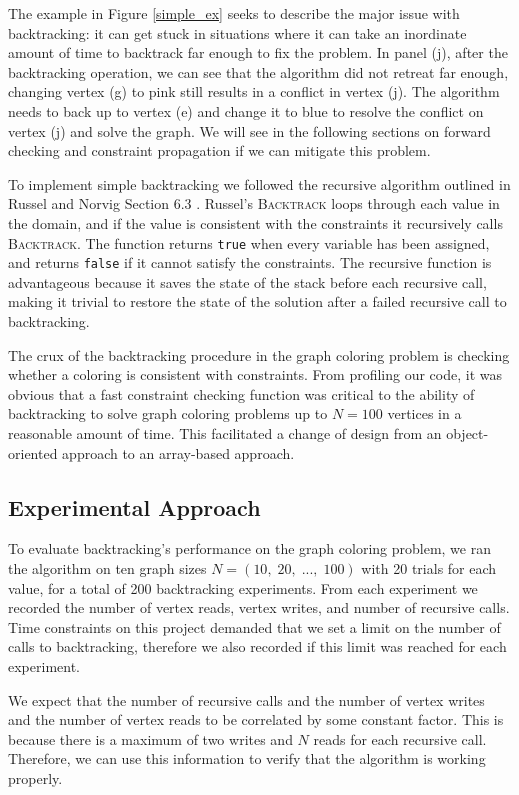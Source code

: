 \documentclass{article}
\begin{document}
		The example in Figure \ref{simple_ex} seeks to describe the major issue with backtracking: it can get stuck in situations where it can take an inordinate amount of time to backtrack far enough to fix the problem. In panel (j), after the backtracking operation, we can see that the algorithm did not retreat far enough, changing vertex (g) to pink still results in a conflict in vertex (j). The algorithm needs to back up to vertex (e) and change it to blue to resolve the conflict on vertex (j) and solve the graph. We will see in the following sections on forward checking and constraint propagation if we can mitigate this problem.

		
		To implement simple backtracking we followed the recursive algorithm outlined in Russel and Norvig Section 6.3 \cite{ai}. Russel's \textsc{Backtrack} loops through each value in the domain, and if the value is consistent with the constraints it recursively calls \textsc{Backtrack}. The function returns \texttt{true} when every variable has been assigned, and returns \texttt{false} if it cannot satisfy the constraints. The recursive function is advantageous because it saves the state of the stack before each recursive call, making it trivial to restore the state of the solution after a failed recursive call to backtracking. 
		
		The crux of the backtracking procedure in the graph coloring problem is checking whether a coloring is consistent with constraints. From profiling our code, it was obvious that a fast constraint checking function was critical to the ability of backtracking to solve graph coloring problems up to $N=100$ vertices in a reasonable amount of time. This facilitated a change of design from an object-oriented approach to an array-based approach.
	\subsection{Experimental Approach}
		\label{simple_exp_appr}
		To evaluate backtracking's performance on the graph coloring problem, we ran the algorithm on ten graph sizes $N=(10,\;20,\;...,\;100)$ with 20 trials for each value, for a total of 200 backtracking experiments. From each experiment we recorded the number of vertex reads, vertex writes, and number of recursive calls. Time constraints on this project demanded that we set a limit on the number of calls to backtracking, therefore we also recorded if this limit was reached for each experiment. 
		
		We expect that the number of recursive calls and the number of vertex writes and the number of vertex reads to be correlated by some constant factor. This is because there is a maximum of two writes and $N$ reads for each recursive call. Therefore, we can use this information to verify that the algorithm is working properly.
		
\end{document}
